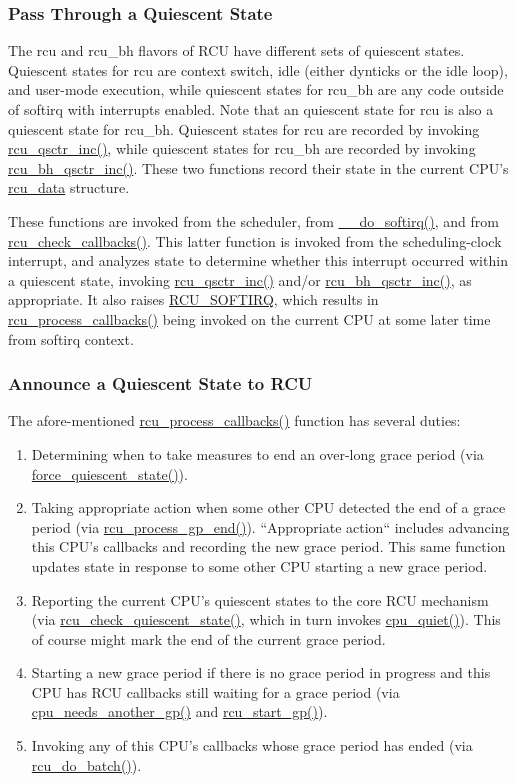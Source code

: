 \subsubsection{Pass Through a Quiescent State}
\label{app:rcuimpl:rcutree:Pass Through a Quiescent State}

The rcu and rcu\_bh flavors of RCU have different sets of quiescent
states.
Quiescent states for rcu are context switch, idle (either dynticks or
the idle loop), and user-mode execution, while quiescent states for
rcu\_bh are any code outside of softirq with interrupts enabled.
Note that an quiescent state for rcu is also a quiescent state
for rcu\_bh.
Quiescent states for rcu are recorded by invoking \url{rcu_qsctr_inc()},
while quiescent states for rcu\_bh are recorded by invoking
\url{rcu_bh_qsctr_inc()}.
These two functions record their state in the current CPU's
\url{rcu_data} structure.

These functions are invoked from the scheduler, from
\url{__do_softirq()}, and from \url{rcu_check_callbacks()}.
This latter function is invoked from the scheduling-clock interrupt,
and analyzes state to determine whether this interrupt occurred within
a quiescent state, invoking \url{rcu_qsctr_inc()} and/or
\url{rcu_bh_qsctr_inc()}, as appropriate.
It also raises \url{RCU_SOFTIRQ}, which results in
\url{rcu_process_callbacks()} being invoked on the current
CPU at some later time from softirq context.

\subsubsection{Announce a Quiescent State to RCU}
\label{app:rcuimpl:rcutree:Announce a Quiescent State to RCU}

The afore-mentioned \url{rcu_process_callbacks()} function
has several duties:

\begin{enumerate}
\item	Determining when to take measures to end an over-long grace period
	(via \url{force_quiescent_state()}).
\item	Taking appropriate action when some other CPU detected the end of
	a grace period (via \url{rcu_process_gp_end()}).
	``Appropriate action`` includes advancing this CPU's
	callbacks and recording the new grace period.
	This same function updates state in response to some other
	CPU starting a new grace period.
\item	Reporting the current CPU's quiescent states to the core RCU
	mechanism (via \url{rcu_check_quiescent_state()}, which
	in turn invokes \url{cpu_quiet()}).
	This of course might mark the end of the current grace period.
\item	Starting a new grace period if there is no grace period in progress
	and this CPU has RCU callbacks still waiting for a grace period
	(via \url{cpu_needs_another_gp()} and
	\url{rcu_start_gp()}).
\item	Invoking any of this CPU's callbacks whose grace period has ended
	(via \url{rcu_do_batch()}).
\end{enumerate}

